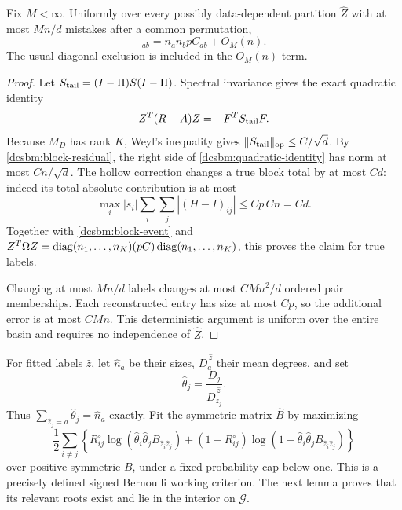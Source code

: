 \begin{lemma}
\label{dcsbm:block-totals}
Fix \(M<\infty\).  Uniformly over every possibly data-dependent
partition \(\widehat Z\) with at most \(Mn/d\) mistakes after a common
permutation,
\begin{equation}
 [\widehat Z^TR^\circ\widehat Z]_{ab}
 =n_an_bpC_{ab}+O_M(n).
 \label{dcsbm:totals-accuracy}
\end{equation}
The usual diagonal exclusion is included in the \(O_M(n)\) term.
\end{lemma}

\begin{proof}
Let \(S_{\rm tail}=(I-\Pi)S(I-\Pi)\).  Spectral invariance gives the
exact quadratic identity
\begin{equation}
 Z^T(R-A)Z=-F^TS_{\rm tail}F .
 \label{dcsbm:quadratic-identity}
\end{equation}
Because \(M_D\) has rank \(K\), Weyl's inequality gives
\(\|S_{\rm tail}\|_{\mathrm{op}}\le C/\sqrt d\).
By \cref{dcsbm:block-residual}, the right side of
\cref{dcsbm:quadratic-identity} has norm at most \(Cn/\sqrt d\).
The hollow correction changes a true block total by at most \(Cd\):
indeed its total absolute contribution is at most
\[
 \max_i|s_i|\sum_i\sum_j|(H-I)_{ij}|
 \le Cp\,Cn=Cd.
\]
Together with \cref{dcsbm:block-event} and
\(Z^T\Omega Z=\operatorname{diag}(n_1,\ldots,n_K)(pC)\operatorname{diag}(n_1,\ldots,n_K)\),
this proves the claim for true labels.

Changing at most \(Mn/d\) labels changes at most \(C Mn^2/d\)
ordered pair memberships.  Each reconstructed entry has size at
most \(Cp\), so the additional error is at most \(C Mn\).
This deterministic argument is uniform over the entire basin and
requires no independence of \(\widehat Z\).
\end{proof}

For fitted labels \(\widehat z\), let \(\widehat n_a\) be their sizes,
\(\overline D_a^{\,\widehat z}\) their mean degrees, and set
\begin{equation}
 \widehat\theta_j=\frac{D_j}{\overline D_{\widehat z_j}^{\,\widehat z}}.
 \label{dcsbm:theta-fit}
\end{equation}
Thus \(\sum_{\widehat z_j=a}\widehat\theta_j=\widehat n_a\)
exactly.  Fit the symmetric matrix \(\widehat B\) by maximizing
\begin{equation}
 \frac12\sum_{i\ne j}\left\{
 R^\circ_{ij}\log(\widehat\theta_i\widehat\theta_j B_{\widehat z_i\widehat z_j})
 +(1-R^\circ_{ij})
       \log(1-\widehat\theta_i\widehat\theta_j B_{\widehat z_i\widehat z_j})
 \right\}
 \label{dcsbm:block-criterion}
\end{equation}
over positive symmetric \(B\), under a fixed probability cap below one.
This is a precisely defined signed Bernoulli working criterion.
The next lemma proves that its relevant roots exist and lie in the
interior on \(\mathcal G\).

